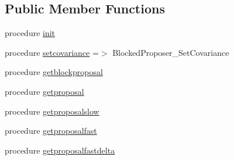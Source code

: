 \subsection*{Public Member Functions}
\begin{DoxyCompactItemize}
\item 
procedure \mbox{\hyperlink{structpropose_1_1blockedproposer_a78faf06a7c0726f9ac50749fea2cb557}{init}}
\item 
procedure \mbox{\hyperlink{structpropose_1_1blockedproposer_a57a3934d0d7648b37452d23c4dc1a619}{setcovariance}} =$>$ Blocked\+Proposer\+\_\+\+Set\+Covariance
\item 
procedure \mbox{\hyperlink{structpropose_1_1blockedproposer_a53d5ab124ff13905f244cfab73cb3d14}{getblockproposal}}
\item 
procedure \mbox{\hyperlink{structpropose_1_1blockedproposer_afc47cc3a1725cdfee9eb257b0beb11ab}{getproposal}}
\item 
procedure \mbox{\hyperlink{structpropose_1_1blockedproposer_a5ddfb268156973d4591089ef50a572d8}{getproposalslow}}
\item 
procedure \mbox{\hyperlink{structpropose_1_1blockedproposer_a88b274ce3ee6f6d365089293951f6165}{getproposalfast}}
\item 
procedure \mbox{\hyperlink{structpropose_1_1blockedproposer_a78a377174761cff07825c3340487b183}{getproposalfastdelta}}
\end{DoxyCompactItemize}
